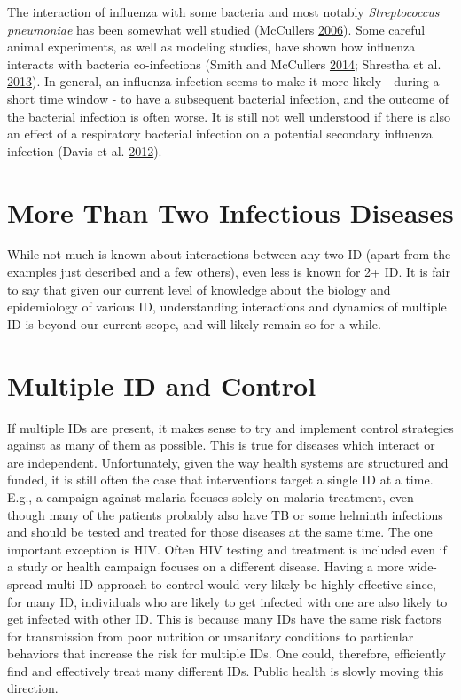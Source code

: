 \documentclass[]{book}
\theoremstyle{definition}
\theoremstyle{definition}
\theoremstyle{definition}
\theoremstyle{remark}
\begin{document}
The interaction of influenza with some bacteria and most notably
\emph{Streptococcus pneumoniae} has been somewhat well studied
(McCullers \protect\hyperlink{ref-mccullers06}{2006}). Some careful
animal experiments, as well as modeling studies, have shown how
influenza interacts with bacteria co-infections (Smith and McCullers
\protect\hyperlink{ref-smith14a}{2014}; Shrestha et al.
\protect\hyperlink{ref-shrestha13}{2013}). In general, an influenza
infection seems to make it more likely - during a short time window - to
have a subsequent bacterial infection, and the outcome of the bacterial
infection is often worse. It is still not well understood if there is
also an effect of a respiratory bacterial infection on a potential
secondary influenza infection (Davis et al.
\protect\hyperlink{ref-davis12}{2012}).

\section{More Than Two Infectious
Diseases}\label{more-than-two-infectious-diseases}

While not much is known about interactions between any two ID (apart
from the examples just described and a few others), even less is known
for 2+ ID. It is fair to say that given our current level of knowledge
about the biology and epidemiology of various ID, understanding
interactions and dynamics of multiple ID is beyond our current scope,
and will likely remain so for a while.

\section{Multiple ID and Control}\label{multiple-id-and-control}

If multiple IDs are present, it makes sense to try and implement control
strategies against as many of them as possible. This is true for
diseases which interact or are independent. Unfortunately, given the way
health systems are structured and funded, it is still often the case
that interventions target a single ID at a time. E.g., a campaign
against malaria focuses solely on malaria treatment, even though many of
the patients probably also have TB or some helminth infections and
should be tested and treated for those diseases at the same time. The
one important exception is HIV. Often HIV testing and treatment is
included even if a study or health campaign focuses on a different
disease. Having a more wide-spread multi-ID approach to control would
very likely be highly effective since, for many ID, individuals who are
likely to get infected with one are also likely to get infected with
other ID. This is because many IDs have the same risk factors for
transmission from poor nutrition or unsanitary conditions to particular
behaviors that increase the risk for multiple IDs. One could, therefore,
efficiently find and effectively treat many different IDs. Public health
is slowly moving this direction.
\end{document}

